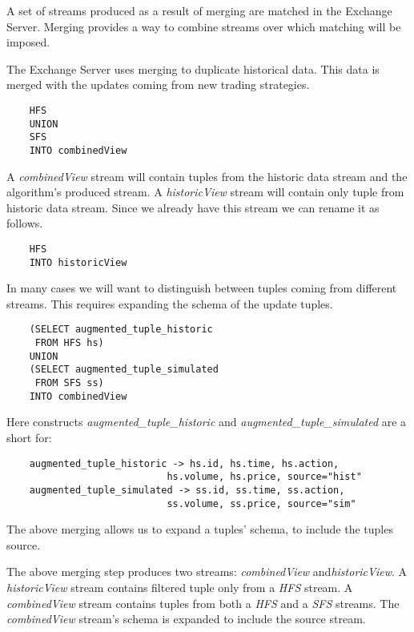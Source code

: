 \documentclass{article}
\begin{document}
A set of streams produced as a result of merging are matched in the Exchange Server. Merging provides a way to combine streams over which matching will be imposed. 

The Exchange Server uses merging to duplicate historical data. This data is merged with the updates coming from new trading strategies.

\begin{verbatim}  
    HFS
    UNION
    SFS
    INTO combinedView
\end{verbatim}

\noindent A \emph{combinedView} stream will contain tuples from the historic data stream and the algorithm's produced stream. A \emph{historicView} stream will contain only tuple from historic data stream. Since we already have this stream we can rename it as follows.

\begin{verbatim}  
    HFS
    INTO historicView
\end{verbatim}


In many cases we will want to distinguish between tuples coming from different streams. This requires expanding the schema of the update tuples. 

\begin{verbatim}  
    (SELECT augmented_tuple_historic
     FROM HFS hs)
    UNION
    (SELECT augmented_tuple_simulated
     FROM SFS ss)
    INTO combinedView
\end{verbatim}

Here constructs \emph{augmented\_tuple\_historic} and \emph{augmented\_tuple\_simulated} are a short for:

\begin{verbatim}
    augmented_tuple_historic -> hs.id, hs.time, hs.action,
                            hs.volume, hs.price, source="hist"
    augmented_tuple_simulated -> ss.id, ss.time, ss.action,
                            ss.volume, ss.price, source="sim"
\end{verbatim}

The above merging allows us to expand a tuples' schema, to include the tuples source. 

The above merging step produces two streams: \emph{combinedView} and\emph{historicView}. A \emph{historicView} stream contains filtered tuple only from a \emph{HFS} stream. A \emph{combinedView} stream contains tuples from both a \emph{HFS} and a \emph{SFS} streams. The \emph{combinedView} stream's schema is expanded to include the source stream.
\end{document}

